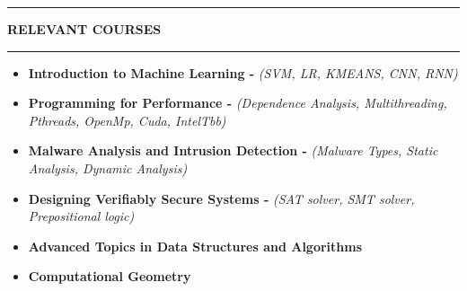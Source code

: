 \documentclass[10pt]{extarticle}
\begin{document}
\noindent\rule[0ex]{\linewidth}{0.5mm}
{\textbf{\textsc{RELEVANT COURSES}}}
\noindent\rule[1.5ex]{\linewidth}{0.5mm}
\begin{itemize}
    \item \textbf{Introduction to Machine Learning -} \emph{(SVM, LR, KMEANS, CNN, RNN)}
    \item \textbf{Programming for Performance -} \emph{(Dependence Analysis, Multithreading, Pthreads, Open\MakeUppercase{m}p, Cuda, IntelTbb)}
    \item \textbf{Malware Analysis and Intrusion Detection -} \emph{(Malware Types, Static Analysis, Dynamic Analysis)}
    \item \textbf{Designing Verifiably Secure Systems -} \emph{(SAT solver, SMT solver, Prepositional logic)}
    \item \textbf{Advanced Topics in Data Structures and Algorithms } 
    \item \textbf{Computational Geometry}
\end{itemize}
\end{document}
